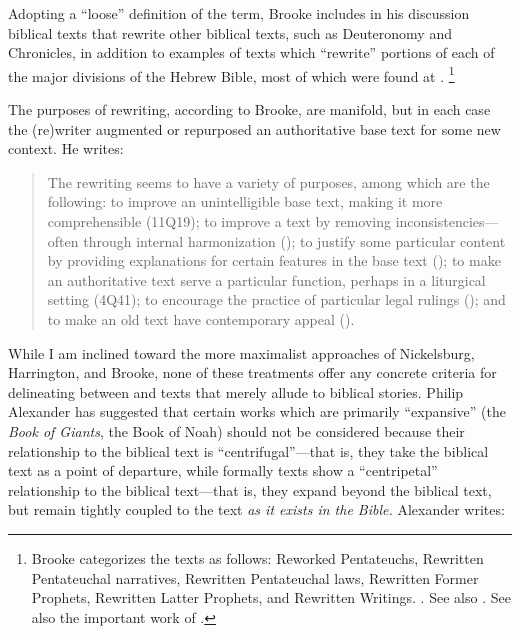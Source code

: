     \autocite[777]{brooke_schiffman-vanderkam2000}
Adopting a ``loose'' definition of the term, Brooke includes in his discussion biblical texts that rewrite other biblical texts, such as Deuteronomy and Chronicles, in addition to examples of texts which ``rewrite'' portions of each of the major divisions of the Hebrew Bible, most of which were found at \qumran.%
    \footnote{%
        Brooke categorizes the texts as follows: Reworked Pentateuchs, Rewritten Pentateuchal narratives, Rewritten Pentateuchal laws, Rewritten Former Prophets, Rewritten Latter Prophets, and Rewritten Writings.
        \cite[778--780]{brooke_schiffman-vanderkam2000}. See also 
        \cite{brooke_herbert-tov2002}. See also the important work of 
        \cite{falk2007}.}

The purposes of rewriting, according to Brooke, are manifold, but in each case the (re)writer augmented or repurposed an authoritative base text for some new context. He writes: 

\begin{quote}
    The rewriting seems to have a variety of purposes, among which are the following: to improve an unintelligible base text, making it more comprehensible (11Q19); to improve a text by removing inconsistencies---often through internal harmonization (); to justify some particular content by providing explanations for certain features in the base text (); to make an authoritative text serve a particular function, perhaps in a liturgical setting (4Q41); to encourage the practice of particular legal rulings (\jub); and to make an old text have contemporary appeal (\templescroll).%
    \autocite[778]{brooke_schiffman-vanderkam2000}
\end{quote} 

While I am inclined toward the more maximalist approaches of Nickelsburg, Harrington, and Brooke, none of these treatments offer any concrete criteria for delineating between \rwb and texts that merely allude to biblical stories. Philip Alexander has suggested that certain works which are primarily ``expansive'' (the \emph{Book of Giants}, the Book of Noah) should not be considered \rwb because their relationship to the biblical text is ``centrifugal''---that is, they take the biblical text as a point of departure, while formally \rwb texts show a ``centripetal'' relationship to the biblical text---that is, they expand beyond the biblical text, but remain tightly coupled to the text \emph{as it exists in the Bible.} Alexander writes: 

